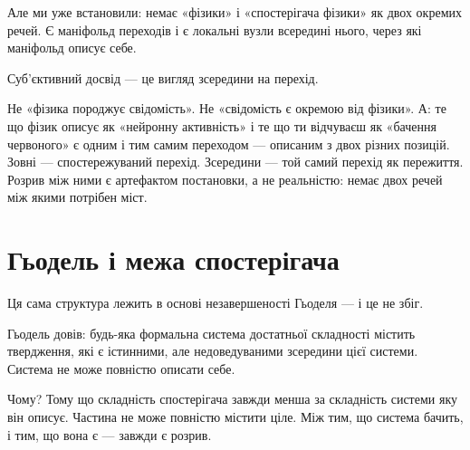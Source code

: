 \documentclass[12pt, a4paper, openany]{book}
\begin{document}
Але ми уже встановили: немає «фізики» і «спостерігача фізики» як двох окремих речей. Є маніфольд переходів і є локальні вузли всередині нього, через які маніфольд описує себе.

Суб'єктивний досвід --- це вигляд зсередини на перехід.

Не «фізика породжує свідомість». Не «свідомість є окремою від фізики». А: те що фізик описує як «нейронну активність» і те що ти відчуваєш як «бачення червоного» є одним і тим самим переходом --- описаним з двох різних позицій. Зовні --- спостережуваний перехід. Зсередини --- той самий перехід як пережиття. Розрив між ними є артефактом постановки, а не реальністю: немає двох речей між якими потрібен міст.

\section{Гьодель і межа спостерігача}

Ця сама структура лежить в основі незавершеності Гьоделя --- і це не збіг.

Гьодель довів: будь-яка формальна система достатньої складності містить твердження, які є істинними, але недоведуваними зсередини цієї системи. Система не може повністю описати себе.

Чому? Тому що складність спостерігача завжди менша за складність системи яку він описує. Частина не може повністю містити ціле. Між тим, що система бачить, і тим, що вона є --- завжди є розрив.
\end{document}
